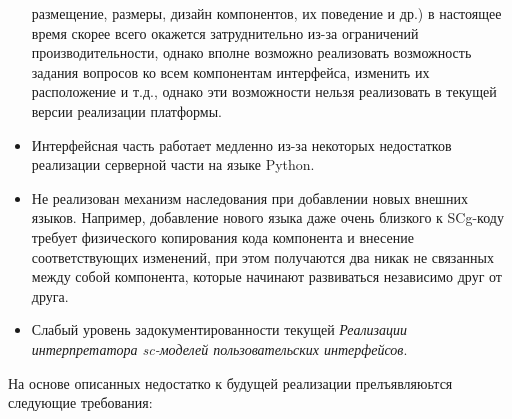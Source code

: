 \begin{itemize}
    размещение, размеры, дизайн компонентов, их поведение и др.) в настоящее время скорее всего окажется затруднительно
    из-за ограничений производительности, однако вполне возможно реализовать возможность задания вопросов ко всем
    компонентам интерфейса, изменить их расположение и т.д., однако эти возможности нельзя реализовать в текущей
    версии реализации платформы.
    \item Интерфейсная часть работает медленно из-за некоторых недостатков реализации серверной части на языке Python.
    \item Не реализован механизм наследования при добавлении новых внешних языков. Например, добавление нового языка
    даже очень близкого к SCg-коду требует физического копирования кода компонента и внесение соответствующих изменений,
    при этом получаются два никак не связанных между собой компонента, которые начинают развиваться независимо друг от
    друга.
    \item Слабый уровень задокументированности текущей \textit{Реализации интерпретатора sc-моделей пользовательских
    интерфейсов}.
\end{itemize}

На основе описанных недостатко к будущей реализации прелъявляюьтся следующие требования:

